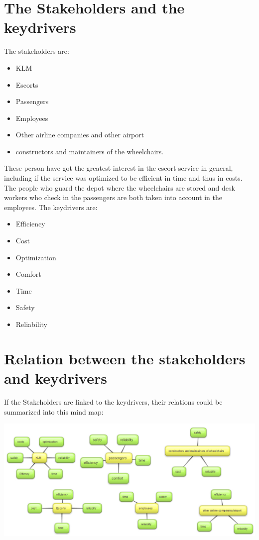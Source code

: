 \documentclass[a4paper, 11pt, notitlepage]{report}
\begin{document}
\section{The Stakeholders and the keydrivers }
The stakeholders are:
\begin{itemize}
 \item KLM
 \item Escorts
 \item Passengers
 \item Employees
 \item Other airline companies and other airport
 \item  constructors and maintainers of the wheelchairs.
\end{itemize}
These person have got the greatest interest in the escort service in general, including if the service was optimized to be efficient in time and thus in costs. The people who guard the depot where the wheelchairs are stored and desk workers who check in the passengers are both taken into account in the employees. The keydrivers are:
\begin{itemize}
	\item Efficiency
	\item Cost
	\item Optimization
	\item Comfort
	\item Time
	\item Safety
	\item Reliability
\end{itemize}
\section{Relation between the stakeholders and keydrivers}
If the Stakeholders are linked to the keydrivers, their relations could be summarized into this mind map:
\begin{center}
\includegraphics[scale=0.4]{figures/relationstakeholders.jpg}
\end{center}
\end{document}
